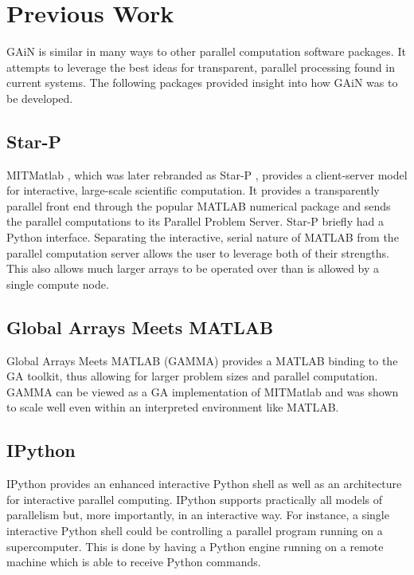 \documentclass[preprint]{sigplanconf}
\begin{document}
\section{Previous Work}

GAiN is similar in many ways to other parallel computation software packages.
It attempts to leverage the best ideas for transparent, parallel processing
found in current systems. The following packages provided insight into how
GAiN was to be developed.

\subsection{Star-P}

MITMatlab \cite{Hus98}, which was later rebranded as Star-P \cite{Ede07},
provides a client-server model for interactive, large-scale scientific
computation. It provides a transparently parallel front end through the
popular MATLAB \cite{Pal07} numerical package and sends the parallel
computations to its Parallel Problem Server. Star-P briefly had a Python
interface. Separating the interactive, serial nature of MATLAB from the
parallel computation server allows the user to leverage both of their
strengths. This also allows much larger arrays to be operated over than is
allowed by a single compute node.

\subsection{Global Arrays Meets MATLAB}

Global Arrays Meets MATLAB (GAMMA) \cite{Pan06} provides a MATLAB binding to
the GA toolkit, thus allowing for larger problem sizes and parallel
computation.  GAMMA can be viewed as a GA implementation of MITMatlab and was
shown to scale well even within an interpreted environment like MATLAB.

\subsection{IPython}

IPython \cite{Per07} provides an enhanced interactive Python shell as well as
an architecture for interactive parallel computing. IPython supports
practically all models of parallelism but, more importantly, in an interactive
way. For instance, a single interactive Python shell could be controlling a
parallel program running on a supercomputer. This is done by having a Python
engine running on a remote machine which is able to receive Python commands.
\end{document}
